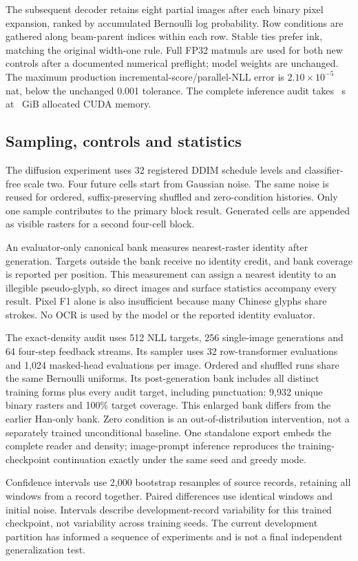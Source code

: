 The subsequent decoder retains eight partial images after each binary pixel
expansion, ranked by accumulated Bernoulli log probability. Row conditions are
gathered along beam-parent indices within each row. Stable ties prefer ink,
matching the original width-one rule. Full FP32 matmuls are used for both new
controls after a documented numerical preflight; model weights are unchanged.
The maximum production incremental-score/parallel-NLL error is
$2.10\times10^{-5}$ nat, below the unchanged 0.001 tolerance. The complete
inference audit takes \BeamSeconds\ s at \BeamMemory\ GiB allocated CUDA memory.

\subsection*{Sampling, controls and statistics}
The diffusion experiment uses 32 registered DDIM schedule levels and classifier-free scale
two. Four future cells start from Gaussian noise. The same noise is reused for
ordered, suffix-preserving shuffled and zero-condition histories. Only one
sample contributes to the primary block result. Generated cells are appended
as visible rasters for a second four-cell block.

An evaluator-only canonical bank measures nearest-raster identity after
generation. Targets outside the bank receive no identity credit, and bank
coverage is reported per position. This measurement can assign a nearest
identity to an illegible pseudo-glyph, so direct images and surface statistics
accompany every result. Pixel F1 alone is also insufficient because many
Chinese glyphs share strokes. No OCR is used by the model or the reported
identity evaluator.

The exact-density audit uses 512 NLL targets, 256 single-image generations and
64 four-step feedback streams. Its sampler uses 32 row-transformer evaluations
and 1,024 masked-head evaluations per image. Ordered and shuffled runs share
the same Bernoulli uniforms. Its post-generation bank includes all distinct
training forms plus every audit target, including punctuation: 9,932 unique
binary rasters and 100\% target coverage. This enlarged bank differs from the
earlier Han-only bank. Zero condition is an out-of-distribution intervention,
not a separately trained unconditional baseline. One standalone export embeds
the complete reader and density; image-prompt inference reproduces the
training-checkpoint continuation exactly under the same seed and greedy mode.

Confidence intervals use 2,000 bootstrap resamples of source records, retaining
all windows from a record together. Paired differences use identical windows
and initial noise. Intervals describe development-record variability for this
trained checkpoint, not variability across training seeds. The current
development partition has informed a sequence of experiments and is not a
final independent generalization test.

